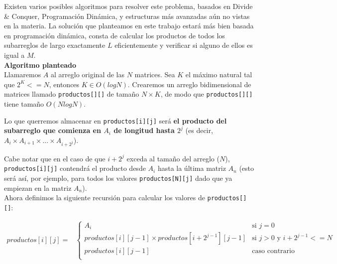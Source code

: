 Existen varios posibles algoritmos para resolver este problema, basados en Divide \& Conquer, 
Programación Dinámica, y estructuras más avanzadas aún no vistas en la materia. La solución que 
planteamos en este trabajo estará más bien basada en programación dinámica, consta de calcular 
los productos de 
todos los subarreglos de largo exactamente $L$ eficientemente y verificar si alguno de ellos 
es igual a $M$. \\

\textbf{Algoritmo planteado}\\

Llamaremos $A$ al arreglo original de las $N$ matrices. 
Sea $K$ el máximo natural tal que $2^K <= N$, entonces $K \in O(log N)$. Crearemos un arreglo 
bidimensional de matrices llamado \texttt{productos[][]} de tamaño $N \times K$, de modo que 
\texttt{productos[][]} tiene tamaño $O(N log N)$. 

Lo que querremos almacenar en \texttt{productos[i][j]} será \textbf{el producto del subarreglo que 
comienza en $A_i$ de longitud hasta $2^j$} (es decir, $A_i \times A_{i+1} \times ... \times A_{i+2^j}$). 

Cabe notar que en el caso de que $i+2^j$ exceda al tamaño del arreglo ($N$), 
\texttt{productos[i][j]} contendrá el producto desde $A_i$ hasta 
la última matriz $A_n$ (esto será así, por ejemplo, para todos los valores \texttt{productos[N][j]} dado 
que ya empiezan en la matriz $A_n$). \\

Ahora definimos la siguiente recursión para calcular los valores de \texttt{productos[][]}: 

\begin{align*}
productos[i][j] =
	&\begin{cases}
		A_i & \text{si $j=0$} \\
		productos[i][j-1] \times productos[i+2^{j-1}][j-1] & \text{si $j>0$ y $i+2^{j-1}<=N$} \\
		productos[i][j-1] & \text{caso contrario} \\
	\end{cases} \\
\end{align*}

